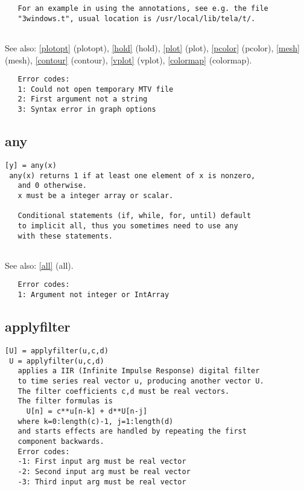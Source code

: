 \documentclass[a4paper]{article}
\begin{document}
\begin{tscreen}
\begin{verbatim}
   For an example in using the annotations, see e.g. the file
   "3windows.t", usual location is /usr/local/lib/tela/t/.
   
\end{verbatim}

See also: \ref{plotopt} {(plotopt)}, \ref{hold} {(hold)}, \ref{plot} {(plot)}, \ref{pcolor} {(pcolor)}, \ref{mesh} {(mesh)}, \ref{contour} {(contour)}, \ref{vplot} {(vplot)}, \ref{colormap} {(colormap)}.
\begin{verbatim}
   Error codes:
   1: Could not open temporary MTV file
   2: First argument not a string
   3: Syntax error in graph options 
\end{verbatim}
\end{tscreen}





\subsection{any\label{any}}

\begin{tscreen}
\begin{verbatim}
[y] = any(x)
 any(x) returns 1 if at least one element of x is nonzero,
   and 0 otherwise.
   x must be a integer array or scalar.

   Conditional statements (if, while, for, until) default
   to implicit all, thus you sometimes need to use any
   with these statements.
   
\end{verbatim}

See also: \ref{all} {(all)}.
\begin{verbatim}
   Error codes:
   1: Argument not integer or IntArray 
\end{verbatim}
\end{tscreen}





\subsection{applyfilter\label{applyfilter}}

\begin{tscreen}
\begin{verbatim}
[U] = applyfilter(u,c,d)
 U = applyfilter(u,c,d)
   applies a IIR (Infinite Impulse Response) digital filter
   to time series real vector u, producing another vector U.
   The filter coefficients c,d must be real vectors.
   The filter formulas is
     U[n] = c**u[n-k] + d**U[n-j]
   where k=0:length(c)-1, j=1:length(d)
   and starts effects are handled by repeating the first
   component backwards.
   Error codes:
   -1: First input arg must be real vector
   -2: Second input arg must be real vector
   -3: Third input arg must be real vector
\end{verbatim}
\end{tscreen}
\end{document}
